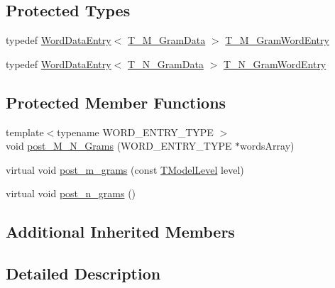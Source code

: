 \subsection*{Protected Types}
\begin{DoxyCompactItemize}
\item 
typedef \hyperlink{classuva_1_1smt_1_1tries_1_1_w2_c_array_trie_1_1_word_data_entry}{Word\+Data\+Entry}$<$ \hyperlink{namespaceuva_1_1smt_1_1tries_1_1_____w2_c_array_trie_ac6f1755aebdfdd6bde13d9e91d22337d}{T\+\_\+\+M\+\_\+\+Gram\+Data} $>$ \hyperlink{classuva_1_1smt_1_1tries_1_1_w2_c_array_trie_a6dd317e401c26bda2ee608e065b10497}{T\+\_\+\+M\+\_\+\+Gram\+Word\+Entry}
\item 
typedef \hyperlink{classuva_1_1smt_1_1tries_1_1_w2_c_array_trie_1_1_word_data_entry}{Word\+Data\+Entry}$<$ \hyperlink{namespaceuva_1_1smt_1_1tries_1_1_____w2_c_array_trie_ac05cbbe324aaedbe98213e21625e2774}{T\+\_\+\+N\+\_\+\+Gram\+Data} $>$ \hyperlink{classuva_1_1smt_1_1tries_1_1_w2_c_array_trie_a7274c5d10d8c998fe137ce0fd58cddf7}{T\+\_\+\+N\+\_\+\+Gram\+Word\+Entry}
\end{DoxyCompactItemize}
\subsection*{Protected Member Functions}
\begin{DoxyCompactItemize}
\item 
{\footnotesize template$<$typename W\+O\+R\+D\+\_\+\+E\+N\+T\+R\+Y\+\_\+\+T\+Y\+P\+E $>$ }\\void \hyperlink{classuva_1_1smt_1_1tries_1_1_w2_c_array_trie_a5f1c56ff84c48b296447c05b9fff5bc0}{post\+\_\+\+M\+\_\+\+N\+\_\+\+Grams} (W\+O\+R\+D\+\_\+\+E\+N\+T\+R\+Y\+\_\+\+T\+Y\+P\+E $\ast$words\+Array)
\item 
virtual void \hyperlink{classuva_1_1smt_1_1tries_1_1_w2_c_array_trie_a9c2e8d02c47f9e295af51d016ff9a7b7}{post\+\_\+m\+\_\+grams} (const \hyperlink{namespaceuva_1_1smt_1_1tries_a20577a44b3a42d26524250634379b7cb}{T\+Model\+Level} level)
\item 
virtual void \hyperlink{classuva_1_1smt_1_1tries_1_1_w2_c_array_trie_ae51519593b88f633f0d00c0a0feb8050}{post\+\_\+n\+\_\+grams} ()
\end{DoxyCompactItemize}
\subsection*{Additional Inherited Members}


\subsection{Detailed Description}

